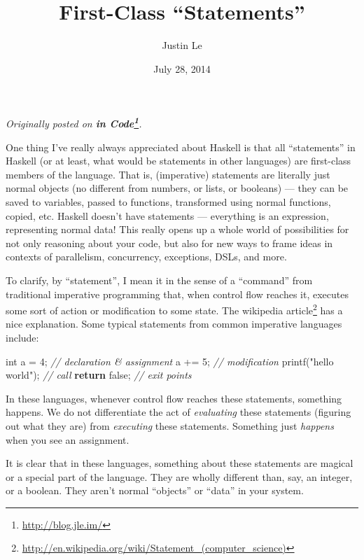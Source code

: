 \documentclass[]{article}
\title{First-Class ``Statements''}
\author{Justin Le}
\date{July 28, 2014}
\newenvironment{Shaded}{}{}
\newcommand{\KeywordTok}[1]{\textcolor[rgb]{0.00,0.44,0.13}{\textbf{{#1}}}}
\newcommand{\DataTypeTok}[1]{\textcolor[rgb]{0.56,0.13,0.00}{{#1}}}
\newcommand{\DecValTok}[1]{\textcolor[rgb]{0.25,0.63,0.44}{{#1}}}
\newcommand{\StringTok}[1]{\textcolor[rgb]{0.25,0.44,0.63}{{#1}}}
\newcommand{\CommentTok}[1]{\textcolor[rgb]{0.38,0.63,0.69}{\textit{{#1}}}}
\newcommand{\NormalTok}[1]{{#1}}
\renewcommand{\href}[2]{#2\footnote{\url{#1}}}
\begin{document}
\maketitle

\emph{Originally posted on \textbf{\href{http://blog.jle.im/}{in
Code}}.}

One thing I've really always appreciated about Haskell is that all
``statements'' in Haskell (or at least, what would be statements in
other languages) are first-class members of the language. That is,
(imperative) statements are literally just normal objects (no different
from numbers, or lists, or booleans) --- they can be saved to variables,
passed to functions, transformed using normal functions, copied, etc.
Haskell doesn't have statements --- everything is an expression,
representing normal data! This really opens up a whole world of
possibilities for not only reasoning about your code, but also for new
ways to frame ideas in contexts of parallelism, concurrency, exceptions,
DSLs, and more.

To clarify, by ``statement'', I mean it in the sense of a ``command''
from traditional imperative programming that, when control flow reaches
it, executes some sort of action or modification to some state. The
\href{http://en.wikipedia.org/wiki/Statement_(computer_science)}{wikipedia
article} has a nice explanation. Some typical statements from common
imperative languages include:

\begin{Shaded}
\begin{Highlighting}[]
\DataTypeTok{int} \NormalTok{a = }\DecValTok{4}\NormalTok{;              }\CommentTok{// declaration & assignment}
\NormalTok{a += }\DecValTok{5}\NormalTok{;                 }\CommentTok{// modification}
\NormalTok{printf(}\StringTok{"hello world"}\NormalTok{);  }\CommentTok{// call}
\KeywordTok{return} \NormalTok{false;           }\CommentTok{// exit points}
\end{Highlighting}
\end{Shaded}

In these languages, whenever control flow reaches these statements,
something happens. We do not differentiate the act of \emph{evaluating}
these statements (figuring out what they are) from \emph{executing}
these statements. Something just \emph{happens} when you see an
assignment.

It is clear that in these languages, something about these statements
are magical or a special part of the language. They are wholly different
than, say, an integer, or a boolean. They aren't normal ``objects'' or
``data'' in your system.
\end{document}
